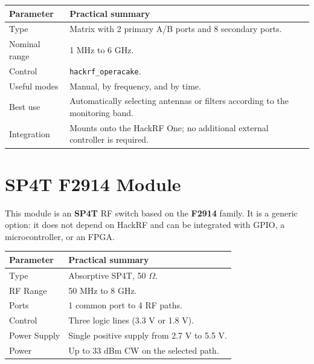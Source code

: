 \documentclass[11pt]{article}
\begin{document}
\begin{table}[h]
    \centering
    \small
    \begin{tabular}{p{}p{}}
        \toprule
        \textbf{Parameter} & \textbf{Practical summary} \\
        \midrule
        Type & Matrix with 2 primary A/B ports and 8 secondary ports. \\
        Nominal range & 1 MHz to 6 GHz. \\
        Control & \texttt{hackrf\_operacake}. \\
        Useful modes & Manual, by frequency, and by time. \\
        Best use & Automatically selecting antennas or filters according to the monitoring band. \\
        Integration & Mounts onto the HackRF One; no additional external controller is required. \\
        \bottomrule
    \end{tabular}
\end{table}

\section{SP4T F2914 Module}

This module is an \textbf{SP4T} RF switch based on the \textbf{F2914} family. It is a generic option: it does not depend on HackRF and can be integrated with GPIO, a microcontroller, or an FPGA.

\begin{table}[h]
    \centering
    \small
    \begin{tabular}{p{}p{}}
        \toprule
        \textbf{Parameter} & \textbf{Practical summary} \\
        \midrule
        Type & Absorptive SP4T, 50 $\Omega$. \\
        RF Range & 50 MHz to 8 GHz. \\
        Ports & 1 common port to 4 RF paths. \\
        Control & Three logic lines (3.3 V or 1.8 V). \\
        Power Supply & Single positive supply from 2.7 V to 5.5 V. \\
        Power & Up to 33 dBm CW on the selected path. \\
        \bottomrule
    \end{tabular}
\end{table}
\end{document}
